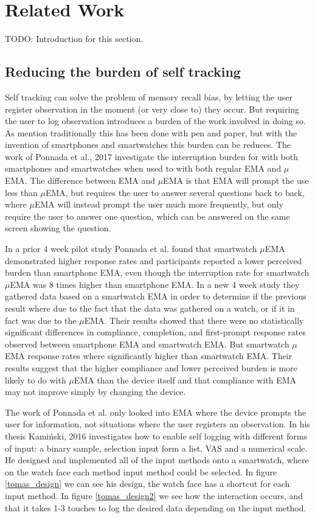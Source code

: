 \chapter{Related Work}

TODO: Introduction for this section. 

\section{Reducing the burden of self tracking}
Self tracking can solve the problem of memory recall bias, by letting the user register observation in the moment (or very close to) they occur. But requiring the user to log observation introduces a burden of the work involved in doing so. As mention traditionally this has been done with pen and paper, but with the invention of smartphones and smartwatches this burden can be reduces. The work of Ponnada et al., 2017\cite{compare} investigate the interruption burden for with both smartphones and smartwatches when used to with both regular EMA and $\mu$EMA. The difference between EMA and $\mu$EMA is that EMA will prompt the use less than $\mu$EMA, but requires the user to answer several questions back to back, where $\mu$EMA will instead prompt the user much more frequently, but only require the user to answer one question, which can be answered on the same screen showing the question. 

In a prior 4 week pilot study Ponnada et al. found that smartwatch $\mu$EMA demonstrated higher response rates and participants reported a lower perceived burden than smartphone EMA, even though the interruption rate for smartwatch $\mu$EMA was 8 times higher than smartphone EMA. In a new 4 week study they gathered data based on a smartwatch EMA in order to determine if the previous result where due to the fact that the data was gathered on a watch, or if it in fact was due to the $\mu$EMA. Their results showed that there were no statistically significant differences in compliance, completion, and first-prompt response rates observed between smartphone EMA and smartwatch EMA. But smartwatch $\mu$EMA response rates where significantly higher than smartwatch EMA. Their results suggest that the higher compliance and lower perceived burden is more likely to do with $\mu$EMA than the device itself and that compliance with EMA may not improve simply by changing the device.

The work of Ponnada et al. only looked into EMA where the device prompts the user for information, not situations where the user registers an observation. In his thesis Kami\'nski, 2016\cite{tomas} investigates how to enable self logging with different forms of input: a binary sample, selection input form a list, VAS and a numerical scale. He designed and implemented all of the input methods onto a smartwatch, where on the watch face each method input method could be selected. In figure \ref{tomas_design} we can see his design, the watch face has a shortcut for each input method. In figure \ref{tomas_design2} we see how the interaction occurs, and that it takes 1-3 touches to log the desired data depending on the input method.

